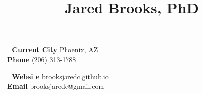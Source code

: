 \documentclass[10pt]{article} %
\begin{document}

\title{Jared Brooks, PhD} %


\parbox{0.5\textwidth}{ %
\begin{tabbing} %
\hspace{3cm} \= \hspace{4cm} \= \kill %
{\bf Current City} \> Phoenix, AZ\\ %
{\bf Phone} \> (206) 313-1788 %
\end{tabbing}}
\hfill %
\parbox{0.5\textwidth}{ %
\begin{tabbing} %
\hspace{3cm} \= \hspace{4cm} \= \kill %
{\bf Website} \> \href{brooksjaredc.github.io}{brooksjaredc.github.io} \\ %
{\bf Email} \> brooksjaredc@gmail.com %
\end{tabbing}}
\end{document}
